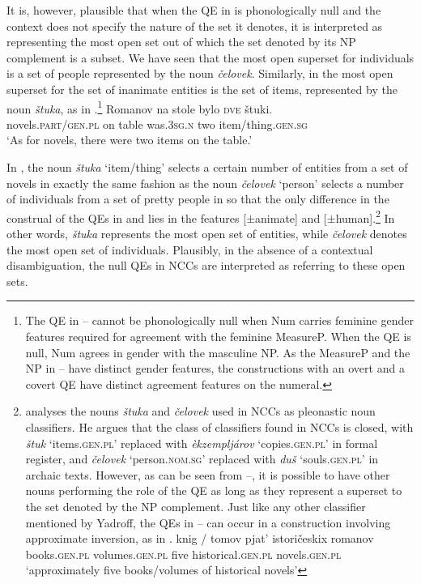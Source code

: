 \documentclass[output=paper,
modfonts,
newtxmath,
hidelinks
]{langscibook}
\begin{document}
\noindent It is, however, plausible that when the QE in  is phonologically null and the context does not specify the nature of the set it denotes, it is interpreted as representing the most open set out of which the set denoted by its NP\textsubscript{} complement is a subset. We have seen that the most open superset for individuals is a set of people represented by the noun \textit{čelovek}. Similarly, in  the most open superset for the set of inanimate entities is the set of items, represented by the noun \textit{štuka}, as in .\footnote{\label{18:fn22}The QE in -- cannot be phonologically null when Num carries feminine gender features required for agreement with the feminine MeasureP. When the QE is null, Num agrees in gender with the masculine NP. As the MeasureP and the NP in -- have distinct gender features, the constructions with an overt and a covert QE have distinct agreement features on the numeral.
} 
\ea \label{18:ex33}
\gll Romanov  na   stole  bylo  \textsc{dve}  štuki.\\
     novels.\textsc{part/gen.pl} on table  was.\textsc{3sg.n}  two  item/thing.\textsc{gen.sg}\\
\glt  `As for novels, there were two items on the table.'
\z

\noindent In , the noun \textit{štuka} ‘item/thing’ selects a certain number of entities from a set of novels in exactly the same fashion as the noun \textit{čelovek} ‘person’ selects a number of individuals from a set of pretty people in  so that the only difference in the construal of the QEs in  and  lies in the features [$\pm$animate] and [$\pm$human].\footnote{\label{18:fn23}\citet{Yadroff1999} analyses the nouns \textit{štuka} and \textit{čelovek} used in NCCs as pleonastic noun classifiers. He argues that the class of classifiers found in NCCs is closed, with \textit{štuk} ‘items\textsc{.gen.pl’} replaced with \textit{èkzempljárov} ‘copies\textsc{.gen.pl’} in formal register, and \textit{čelovek} ‘person.\textsc{nom.sg’} replaced with \textit{duš} ‘souls\textsc{.gen.pl’} in archaic texts. However, as can be seen from --, it is possible to have other nouns performing the role of the QE as long as they represent a superset to the set denoted by the NP complement. Just like any other classifier mentioned by Yadroff, the QEs in -- can occur in a construction involving approximate inversion, as in .  
\ea \label{18:fn23i}
\gll knig / tomov    pjat’   istoričeskix   romanov  \\
 	 books.\textsc{gen.pl} {} volumes.\textsc{gen.pl} five  historical.\textsc{gen.pl}   novels.\textsc{gen.pl}  \\
\glt `approximately five books/volumes of historical novels'
\z
} 
In other words, \textit{štuka} represents the most open set of entities, while \textit{čelovek} denotes the most open set of individuals. Plausibly, in the absence of a contextual disambiguation, the null QEs in NCCs are interpreted as referring to these open sets.
\end{document}
